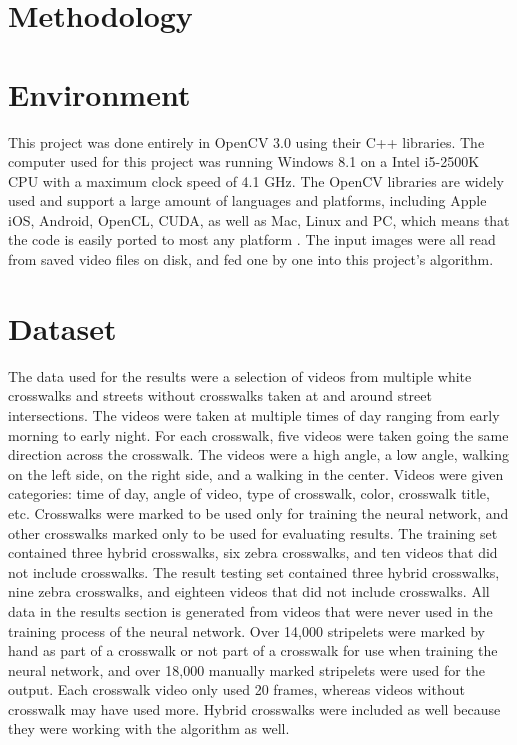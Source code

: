 \documentclass[12pt]{ucthesis}
\begin{document}
\section{Methodology}

\section{Environment}
This project was done entirely in OpenCV 3.0 using their C++ libraries. The computer used for this project was running Windows 8.1 on a Intel i5-2500K CPU with a maximum clock speed of 4.1 GHz. The OpenCV libraries are widely used and support a large amount of languages and platforms, including Apple iOS, Android, OpenCL, CUDA, as well as Mac, Linux and PC, which means that the code is easily ported to most any platform \cite{OpenCVPlatforms}. The input images were all read from saved video files on disk, and fed one by one into this project's algorithm. 

\section{Dataset}
The data used for the results were a selection of videos from multiple white crosswalks and streets without crosswalks taken at and around street intersections. The videos were taken at multiple times of day ranging from early morning to early night. For each crosswalk, five videos were taken going the same direction across the crosswalk. The videos were a high angle, a low angle, walking on the left side, on the right side, and a walking in the center.  Videos were given categories: time of day, angle of video, type of crosswalk, color, crosswalk title, etc. Crosswalks were marked to be used only for training the neural network, and other crosswalks marked only to be used for evaluating results. The training set contained three hybrid crosswalks, six zebra crosswalks, and ten videos that did not include crosswalks. The result testing set contained three hybrid crosswalks, nine zebra crosswalks, and eighteen videos that did not include crosswalks. All data in the results section is generated from videos that were never used in the training process of the neural network. Over 14,000 stripelets were marked by hand as part of a crosswalk or not part of a crosswalk for use when training the neural network, and over 18,000 manually marked stripelets were used for the output. Each crosswalk video only used 20 frames, whereas videos without crosswalk may have used more. Hybrid crosswalks were included as well because they were working with the algorithm as well. 
\end{document}
